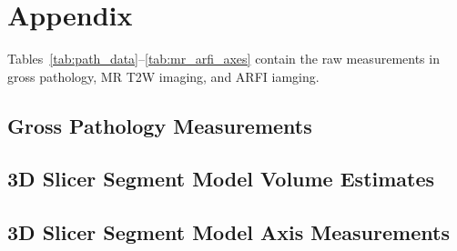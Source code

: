 \section{Appendix}\label{sect:appendix}

Tables~\ref{tab:path_data}--\ref{tab:mr_arfi_axes} contain the raw measurements in gross pathology,
MR T2W imaging, and ARFI iamging.

\subsection*{Gross Pathology Measurements}


\clearpage
\subsection{3D Slicer Segment Model Volume Estimates}


\clearpage
\subsection{3D Slicer Segment Model Axis Measurements}


